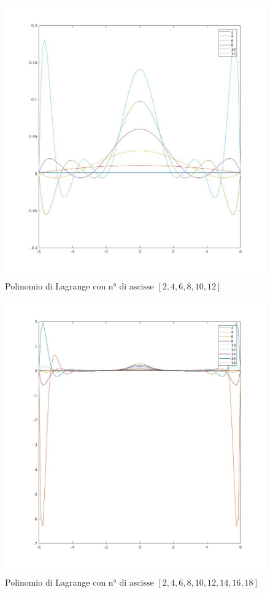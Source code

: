 

\begin{figure}[H]
	\label{Cap_4_Es_9}
	\includegraphics[width=\textwidth]{Plot/Cap_4_Es_9}
	\caption{Polinomio di Lagrange con n° di ascisse $[2,4,6,8,10,12]$}
\end{figure}

\begin{figure}[H]
	\label{Cap_4_Es_9(1)}
	\includegraphics[width=\textwidth]{Plot/Cap_4_Es_9(1)}
	\caption{Polinomio di Lagrange con n° di ascisse $[2,4,6,8,10,12,14,16,18]$}
\end{figure}


